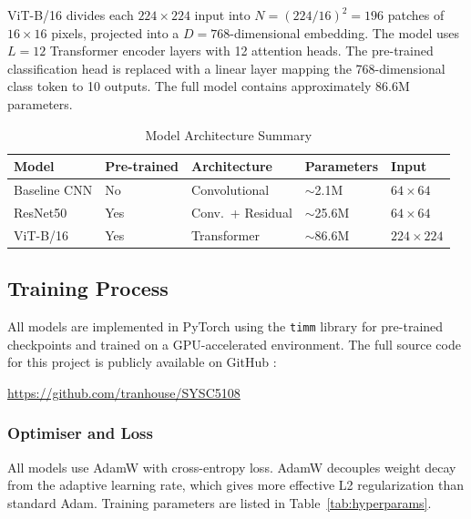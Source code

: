 \documentclass[12pt, letterpaper]{article}
\begin{document}
ViT-B/16 \cite{dosovitskiy2021vit} divides each $224 \times 224$ input into
$N = (224/16)^2 = 196$ patches of $16 \times 16$ pixels, projected into a
$D = 768$-dimensional embedding. The model uses $L = 12$ Transformer encoder layers with 12 attention heads. The pre-trained classification head is replaced with a linear layer mapping the 768-dimensional class token to 10 outputs. The full model contains approximately 86.6M parameters.

\begin{table}[h!]
    \centering
    \caption{Model Architecture Summary}
    \label{tab:arch}
    \begin{tabular}{@{}L{3.2cm} C{2.5cm} C{3.2cm} C{2.5cm} C{2cm}@{}}
        \toprule
        \textbf{Model} & \textbf{Pre-trained} & \textbf{Architecture} &
        \textbf{Parameters} & \textbf{Input} \\
        \midrule
        Baseline CNN & No  & Convolutional        & $\sim$2.1M  & $64{\times}64$ \\
        ResNet50     & Yes & Conv.\ + Residual    & $\sim$25.6M & $64{\times}64$ \\
        ViT-B/16     & Yes & Transformer          & $\sim$86.6M & $224{\times}224$ \\
        \bottomrule
    \end{tabular}
\end{table}

\subsection{Training Process}

All models are implemented in PyTorch \cite{pytorch} using the \texttt{timm} library \cite{timm} for pre-trained checkpoints and trained on a GPU-accelerated environment.
The full source code for this project is publicly available on GitHub \cite{github2026}:
\begin{center}
    \url{https://github.com/tranhouse/SYSC5108}
\end{center}

\subsubsection{Optimiser and Loss}

All models use AdamW \cite{loshchilov2019decoupled} with cross-entropy loss. AdamW decouples weight decay from the adaptive learning rate, which gives more effective L2 regularization than standard Adam. Training parameters are listed in
Table~\ref{tab:hyperparams}.
\end{document}
